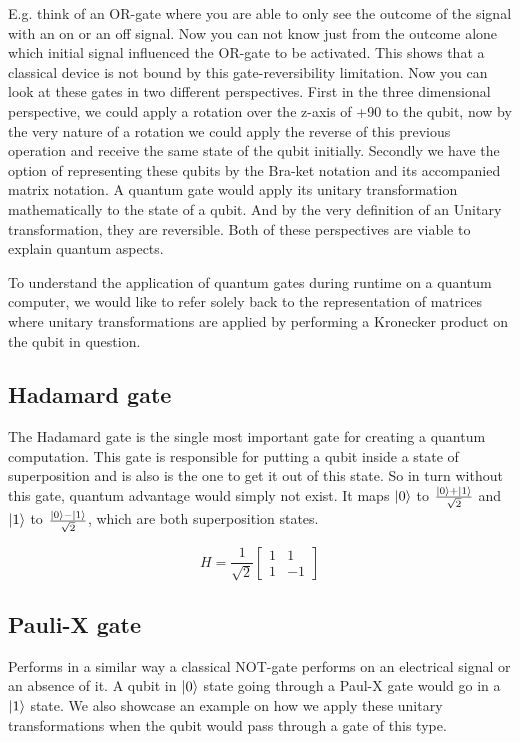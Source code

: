 E.g. think of an OR-gate where you are able to only see the outcome of the signal with an on or an off signal. Now you can not know just from the outcome alone which initial signal influenced the OR-gate to be activated. This shows that a classical device is not bound by this gate-reversibility limitation. Now you can look at these gates in two different perspectives. First in the three dimensional perspective, we could apply a rotation over the z-axis of +90 to the qubit, now by the very nature of a rotation we could apply the reverse of this previous operation and receive the same state of the qubit initially. Secondly we have the option of representing these qubits by the Bra-ket notation and its accompanied matrix notation. A quantum gate would apply its unitary transformation mathematically to the state of a qubit. And by the very definition of an Unitary transformation, they are reversible. Both of these perspectives are viable to explain quantum aspects.

To understand the application of quantum gates during runtime on a quantum computer, we would like to refer solely back to the representation of matrices where unitary transformations are applied by performing a Kronecker product on the qubit in question.

\subsection{Hadamard gate}
The Hadamard gate is the single most important gate for creating a quantum computation. This gate is responsible for putting a qubit inside a state of superposition and is also is the one to get it out of this state. So in turn without this gate, quantum advantage would simply not exist. It maps  $\ket{0}$ to $\frac{\ket{0} + \ket{1}}{\sqrt{2}}$ and $\ket{1}$ to $\frac{\ket{0}-\ket{1}}{\sqrt{2}}$, which are both superposition states.

\[
H=\frac{1}{\sqrt{2}}\begin{bmatrix}
1 & 1 \\
1 & -1
\end{bmatrix}
\]

\subsection{Pauli-X gate}
Performs in a similar way a classical NOT-gate performs on an electrical signal or an absence of it. A qubit in $\ket{0}$ state going through a Paul-X gate would go in a $\ket{1}$ state. We also showcase an example on how we apply these unitary transformations when the qubit would pass through a gate of this type.

